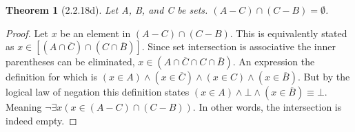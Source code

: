 \documentclass[a4paper, 12pt]{article}
\theoremstyle{plain}
\newtheorem*{theorem*}{Theorem}
\begin{document}
	
	\begin{theorem*}[2.2.18d]
		Let A, B, and C be sets. $(A - C) \cap (C - B) = \emptyset$.
	\end{theorem*}
	
	\begin{proof}
		Let $x$ be an element in $(A - C) \cap (C - B)$. This is equivalently stated as $x \in [(A \cap \overline{C}) \cap (C \cap \overline{B})]$. Since set intersection is associative the inner parentheses can be eliminated, $x \in (A \cap \overline{C} \cap C \cap \overline{B})$. An expression the definition for which is $(x \in A) \land (x \in \overline{C}) \land (x \in C) \land (x \in \overline{B})$. But by the logical law of negation this definition states $(x \in A) \land \bot \land (x \in \overline{B}) \equiv \bot$. Meaning $\lnot \exists x (x \in (A - C) \cap (C - B))$. In other words, the intersection is indeed empty.
	\end{proof}
\end{document}
